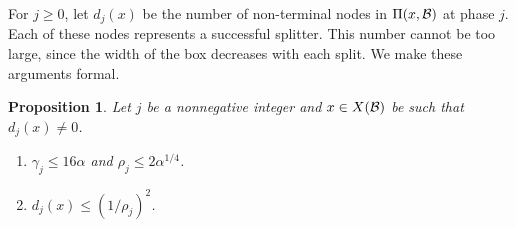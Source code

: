 \documentclass{acmsmall}
\newtheorem{prop}[theorem]{Proposition}
\newcommand{\cB}{{\cal B}}
\newcommand{\gridprec}{\alpha}
\begin{document}
For $j \geq 0$, let $d_j(x)$ be the number of non-terminal nodes in $\Pi(x,\cB)$ at phase $j$. 
Each of these nodes represents a successful splitter.
This number cannot be too large, since the width of the box decreases with each split.
We make these arguments formal.
%

\begin{prop}
\label{prop:phase} Let $j$ be a nonnegative integer and $x \in X(\cB)$ be such that $d_j(x) \neq 0$. 
\begin{enumerate}
\item $\gamma_{j} \leq 16\gridprec$ and $\rho_j \leq 2\gridprec^{1/4}$.
\item $d_j(x) \leq (1/\rho_j)^2$.
\end{enumerate}
\end{prop}
\end{document}
